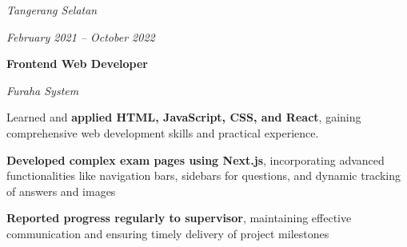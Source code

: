 \documentclass[../main.tex]{subfiles}
\begin{document}
        \begin{twocolentry}{
            \small
        \textit{Tangerang Selatan}    
            
        \textit{February 2021 – October 2022}}
            \textbf{Frontend Web Developer}
            
            \textit{Furaha System}
        \end{twocolentry}

        \vspace{0.10 cm}
        \begin{onecolentry}
            \begin{highlights}
            \item Learned and \textbf{applied HTML, JavaScript, CSS, and React}, gaining comprehensive web development skills and practical experience.
            \item \textbf{Developed complex exam pages using Next.js}, incorporating advanced functionalities like navigation bars, sidebars for questions, and dynamic tracking of answers and images
            \item \textbf{Reported progress regularly to supervisor}, maintaining effective communication and ensuring timely delivery of project milestones
            \end{highlights}
        \end{onecolentry}
\end{document}

